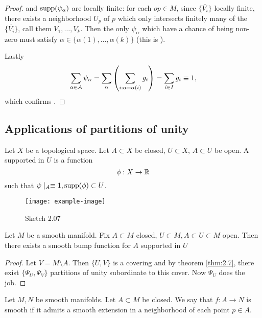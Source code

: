 \begin{proof}
    and 
    \(\text{supp}(\psi_\alpha)\) are locally finite: for each \(op\in M\), since \(\{\overline{V_i}\}\) locally finite,
    there exists a neighborhood \(U_p\) of \(p\)  which only intersects finitely many of the \(\{\overline{V_i}\}\), call 
    them \(V_1,\dots,V_k\). Then the only \(\psi_\alpha\) which have a chance of being non-zero must satisfy \(\alpha\in\{\alpha(1),\dots,\alpha(k)\}\) (this is ).

    Lastly \[\sum_{\alpha\in\mathcal{A}}\psi_\alpha=\sum_{\alpha}\left(\sum_{i: \alpha=\alpha(i)} g_i\right)=\sum_{i\in I} g_i\equiv 1,\]
    which confirms .

\end{proof}


\subsection{Applications of partitions of unity}

\begin{definition*}
    Let \(X\) be a topological space. Let \(A\subset X\) be closed, \(U\subset X\), \(A\subset U\) be open. 
    A  supported in \(U\) is a function \[\phi:X\to\mathbb{R}\]
    such that \(\psi\mid_A \equiv1, \text{supp}(\phi)\subset U\). 
\end{definition*}

\begin{figure}[H]
    \centering
    \texttt{[image: example-image]}
    \caption{Sketch 2.07}
\end{figure}

\begin{proposition}\label{prop:2.8}
    Let \(M\) be a smooth manifold. Fix \(A\subset M\) closed, \(U\subset M,A\subset U\subset M\) open.
    Then there exists a smooth bump function for \(A\) supported in \(U\)
\end{proposition}

\begin{proof}
    Let \(V=M\setminus A\). Then \(\{U,V\}\) is a covering and  by theorem \ref{thm:2.7}, there exist 
    \(\{\Psi_U,\Psi_V\}\) partitions of unity subordinate to this cover. Now \(\Psi_U\) does the job.
\end{proof}

\begin{definition*}
    Let \(M,N\) be smooth manifolds. Let \(A\subset M\) be closed. We say that \(f:A\to N\) is smooth 
    if it admits a smooth extension in a neighborhood of each point \(p\in A\). 
\end{definition*}

